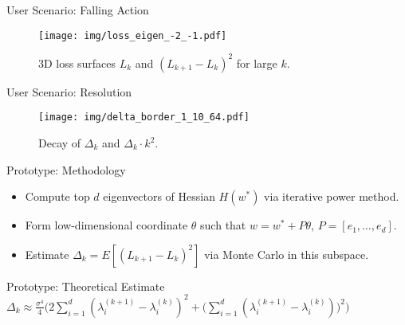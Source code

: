 \documentclass{beamer}
\begin{document}
\begin{frame}{User Scenario: Falling Action}
    \begin{figure}
        \centering
        \texttt{[image: img/loss\_eigen\_-2\_-1.pdf]}
        \caption*{3D loss surfaces $L_k$ and $(L_{k+1}-L_k)^2$ for large $k$.}
    \end{figure}
\end{frame}

\begin{frame}{User Scenario: Resolution}
    \begin{figure}
        \centering
        \texttt{[image: img/delta\_border\_1\_10\_64.pdf]}
        \caption*{Decay of $\Delta_k$ and $\Delta_k\cdot k^2$.}
    \end{figure}
\end{frame}

\begin{frame}{Prototype: Methodology}
    \begin{itemize}
        \item Compute top $d$ eigenvectors of Hessian $H(w^*)$ via iterative power method.
        \item Form low-dimensional coordinate $\theta$ such that $w = w^* + P\theta$, $P=[e_1,\dots,e_d]$.
        \item Estimate $\Delta_k=E[(L_{k+1}-L_k)^2]$ via Monte Carlo in this subspace.
    \end{itemize}
\end{frame}

\begin{frame}{Prototype: Theoretical Estimate}
    \vspace{1em}
    \centering
    $\displaystyle
        \Delta_k\approx\frac{\sigma^4}{4}\Biggl(2\sum_{i=1}^d(\lambda_i^{(k+1)}-\lambda_i^{(k)})^2+\bigl(\sum_{i=1}^d(\lambda_i^{(k+1)}-\lambda_i^{(k)})\bigr)^2\Biggr)$
    \vspace{1em}
\end{frame}
\end{document}
